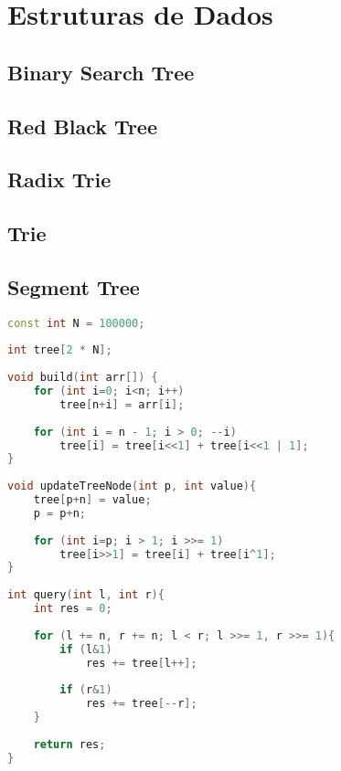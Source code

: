 \chapter{Estruturas de Dados}
\section{Binary Search Tree}

\newpage

\section{Red Black Tree}
\section{Radix Trie}
\section{Trie}
\section{Segment Tree}
\begin{lstlisting}[language=C++, title={Implementação Eficiente}]
const int N = 100000;
 
int tree[2 * N];
 
void build(int arr[]) {
    for (int i=0; i<n; i++)    
        tree[n+i] = arr[i];
     
    for (int i = n - 1; i > 0; --i)     
        tree[i] = tree[i<<1] + tree[i<<1 | 1];    
}
 
void updateTreeNode(int p, int value){ 
    tree[p+n] = value;
    p = p+n;
     
    for (int i=p; i > 1; i >>= 1)
        tree[i>>1] = tree[i] + tree[i^1];
}
 
int query(int l, int r){ 
    int res = 0;
     
    for (l += n, r += n; l < r; l >>= 1, r >>= 1){
        if (l&1) 
            res += tree[l++];
     
        if (r&1) 
            res += tree[--r];
    }
     
    return res;
}
\end{lstlisting}
\newpage
